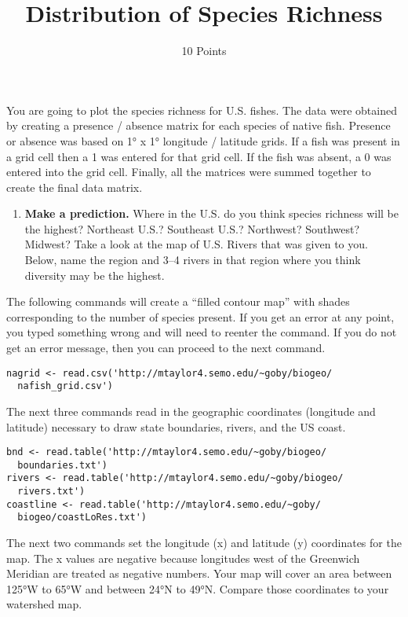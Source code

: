 \documentclass[11pt]{article}
\title{Distribution of Species Richness}
\author{10 Points}
\date{}                                           %
\begin{document}
\maketitle
\thispagestyle{empty}
\fontsize{14pt}{16pt}\selectfont

You are going to plot the species richness for U.S. fishes. The data were
obtained by creating a presence / absence matrix for each species of
native fish. Presence or absence was based on 1° x 1° longitude /
latitude grids. If a fish was present in a grid cell then a 1 was
entered for that grid cell. If the fish was absent, a 0 was entered into
the grid cell. Finally, all the matrices were summed together to create
the final data matrix.

\begin{enumerate}[leftmargin=*]
\item \textbf{Make a prediction.} Where in the U.S. 
do you think species richness will be the highest? Northeast U.S.? Southeast
U.S.? Northwest? Southwest? Midwest? Take a look at the map of U.S. 
Rivers that was given to you.  Below, name the region and 3--4 rivers in that 
region where you think diversity may be the highest.\vspace{10\baselineskip}
\end{enumerate}

The following commands will create a ``filled contour map'' with shades
corresponding to the number of species present. If you get an error at
any point, you typed something wrong and will need to reenter the
command. If you do not get an error message, then you can proceed to the
next command.

\begin{verbatim}
nagrid <- read.csv('http://mtaylor4.semo.edu/~goby/biogeo/
  nafish_grid.csv')
\end{verbatim}

The next three commands read in the geographic coordinates (longitude
and latitude) necessary to draw state boundaries, rivers, and the US
coast.

\begin{verbatim}
bnd <- read.table('http://mtaylor4.semo.edu/~goby/biogeo/
  boundaries.txt')
rivers <- read.table('http://mtaylor4.semo.edu/~goby/biogeo/
  rivers.txt')
coastline <- read.table('http://mtaylor4.semo.edu/~goby/
  biogeo/coastLoRes.txt')
\end{verbatim}

The next two commands set the longitude (x) and latitude (y) coordinates
for the map. The x values are negative because longitudes west of the
Greenwich Meridian are treated as negative numbers. Your map will cover
an area between 125°W to 65°W and between 24°N to 49°N. Compare those
coordinates to your watershed map.
\end{document}

